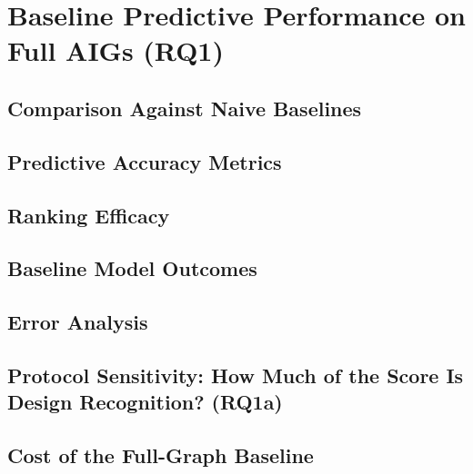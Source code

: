 \section{Baseline Predictive Performance on Full AIGs (RQ1)}
\label{sec:results:rq1}

\subsection{Comparison Against Naive Baselines}
\label{sec:results:rq1:baselines}

\subsection{Predictive Accuracy Metrics}
\label{sec:results:rq1:accuracy}

\subsection{Ranking Efficacy}
\label{sec:results:rq1:ranking}

\subsection{Baseline Model Outcomes}
\label{sec:results:rq1:baselinemodels}

\subsection{Error Analysis}
\label{sec:results:rq1:erroranalysis}

\subsection{Protocol Sensitivity: How Much of the Score Is Design Recognition? (RQ1a)}
\label{sec:results:rq1:protocol}

\subsection{Cost of the Full-Graph Baseline}
\label{sec:results:rq1:hardware}
